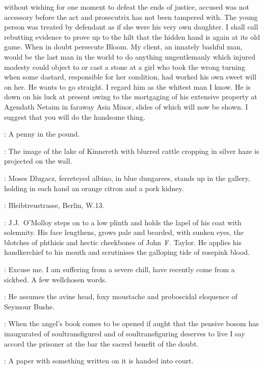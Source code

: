 without wishing for one moment to defeat the ends of justice,
accused was not accessory before the act and prosecutrix has not been tampered with.
The young person was treated by defendant as if she were his very own daughter.
I shall call rebutting evidence to prove up to the hilt
that the hidden hand is again at its old game.
When in doubt persecute Bloom.
My client, an innately bashful man, would be the last man in the world
to do anything ungentlemanly which injured modesty could object to
or cast a stone at a girl who took the wrong turning when some dastard,
responsible for her condition, had worked his own sweet will on her.
He wants to go straight.
I regard him as the whitest man I know.
He is down on his luck at present owing to the mortgaging of his extensive property
at Agendath Netaim in faraway Asia Minor, slides of which will now be shown.
I suggest that you will do the handsome thing.

\Bloom:
A penny in the pound.

:
The image of the lake of Kinnereth with blurred cattle cropping in silver haze
is projected on the wall.

:
Moses Dlugacz, ferreteyed albino, in blue dungarees, stands up in the gallery,
holding in each hand an orange citron and a pork kidney.

\Dlugacz:
Bleibtreustrasse, Berlin, W.13.

:
J.J.~O'Molloy steps on to a low plinth
and holds the lapel of his coat with solemnity.
His face lengthens, grows pale and bearded, with sunken eyes,
the blotches of phthisis and hectic cheekbones of John~F. Taylor.
He applies his handkerchief to his mouth
and scrutinises the galloping tide of rosepink blood.

\JJOM:
Excuse me.
I am suffering from a severe chill, have recently come from a sickbed.
A few wellchosen words.

:
He assumes the avine head, foxy moustache
and proboscidal eloquence of Seymour Bushe.

\JJOM:
When the angel's book comes to be opened
if aught that the pensive bosom has inaugurated of
soultransfigured and of soultransfiguring deserves to live
I say accord the prisoner at the bar the sacred benefit of the doubt.

:
A paper with something written on it is handed into court.

